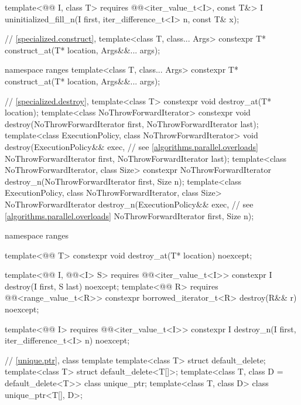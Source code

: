 \begin{codeblock}
{{    template<@@ I, class T>
      requires @@<iter_value_t<I>, const T&>
        I uninitialized_fill_n(I first, iter_difference_t<I> n, const T& x);
  }

  // \ref{specialized.construct}, 
  template<class T, class... Args>
    constexpr T* construct_at(T* location, Args&&... args);

  namespace ranges {
    template<class T, class... Args>
      constexpr T* construct_at(T* location, Args&&... args);
  }

  // \ref{specialized.destroy}, 
  template<class T>
    constexpr void destroy_at(T* location);
  template<class NoThrowForwardIterator>
    constexpr void destroy(NoThrowForwardIterator first, NoThrowForwardIterator last);
  template<class ExecutionPolicy, class NoThrowForwardIterator>
    void destroy(ExecutionPolicy&& exec,                        // see \ref{algorithms.parallel.overloads}
                 NoThrowForwardIterator first, NoThrowForwardIterator last);
  template<class NoThrowForwardIterator, class Size>
    constexpr NoThrowForwardIterator destroy_n(NoThrowForwardIterator first, Size n);
  template<class ExecutionPolicy, class NoThrowForwardIterator, class Size>
    NoThrowForwardIterator destroy_n(ExecutionPolicy&& exec,    // see \ref{algorithms.parallel.overloads}
                                     NoThrowForwardIterator first, Size n);

  namespace ranges {
    template<@@ T>
      constexpr void destroy_at(T* location) noexcept;

    template<@@ I, @@<I> S>
      requires @@<iter_value_t<I>>
        constexpr I destroy(I first, S last) noexcept;
    template<@@ R>
      requires @@<range_value_t<R>>
        constexpr borrowed_iterator_t<R> destroy(R&& r) noexcept;

    template<@@ I>
      requires @@<iter_value_t<I>>
        constexpr I destroy_n(I first, iter_difference_t<I> n) noexcept;
  }

  // \ref{unique.ptr}, class template 
  template<class T> struct default_delete;
  template<class T> struct default_delete<T[]>;
  template<class T, class D = default_delete<T>> class unique_ptr;
  template<class T, class D> class unique_ptr<T[], D>;

}
\end{codeblock}
